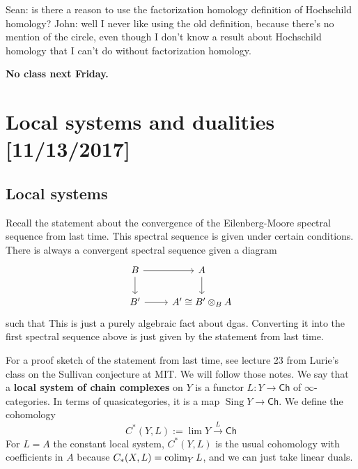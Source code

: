 \documentclass{amsart}
\DeclareMathOperator{\Sing}{Sing}
\begin{document}
Sean: is there a reason to use the factorization homology definition of Hochschild homology?
John: well I never like using the old definition, because there's no mention of the circle, even
though I don't know a result about Hochschild homology that I can't do without factorization
homology.

\textbf{No class next Friday.}

\newpage

\section{Local systems and dualities [11/13/2017]}

\subsection{Local systems}

Recall the statement about the convergence of the Eilenberg-Moore spectral sequence from
last time. This spectral sequence is given
under certain conditions. There is always a convergent spectral sequence given a diagram
\begin{equation*}
    \begin{tikzcd}
        B \rar\dar & A\dar\\
        B' \rar & A'\cong B'\otimes_{B}A
    \end{tikzcd}
\end{equation*}
such that
This is just a purely algebraic fact about dgas.
Converting it into the first spectral sequence above is just given by the statement from last time.

For a proof sketch of the statement from last time, see lecture 23 from Lurie's class
on the Sullivan conjecture at MIT. We will follow those notes.
We say that a \textbf{local system of chain complexes} on $Y$ is a functor
$L:Y\to \mathsf{Ch}$ of $\infty$-categories. In terms of quasicategories,
it is a map $\Sing Y\to \mathsf{Ch}$. We define the cohomology
\begin{equation*}
    C^*(Y,L) := \lim Y\xrightarrow{L}\mathsf{Ch}
\end{equation*}
For $L=A$ the constant local system, $C^*(Y,L)$ is the usual cohomology with
coefficients in $A$ because $C_*(X,L)=\operatorname*{colim}_Y L$, and we can just take linear
duals.
\end{document}

